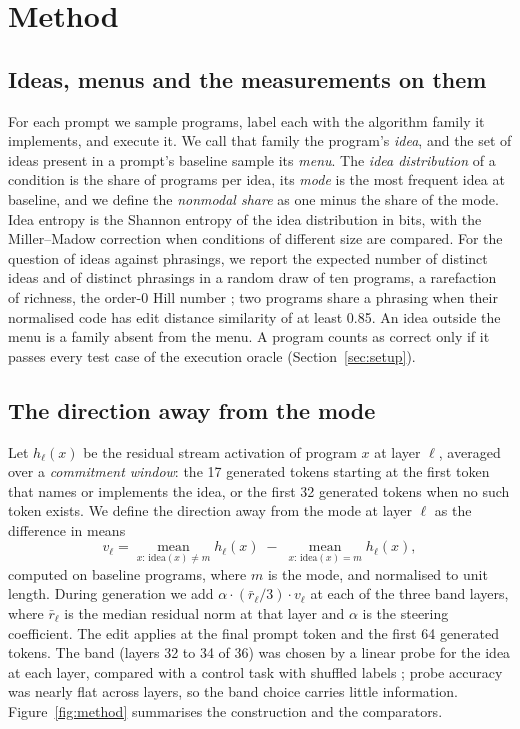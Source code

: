 \documentclass[11pt,letterpaper]{article}
\begin{document}
\section{Method}
\label{sec:method}

\subsection{Ideas, menus and the measurements on them}
\label{sec:measures}

For each prompt we sample programs, label each with the algorithm family it implements, and execute it. We call that family the program's \emph{idea}, and the set of ideas present in a prompt's baseline sample its \emph{menu}. The \emph{idea distribution} of a condition is the share of programs per idea, its \emph{mode} is the most frequent idea at baseline, and we define the \emph{nonmodal share} as one minus the share of the mode. Idea entropy is the Shannon entropy of the idea distribution in bits, with the Miller--Madow correction when conditions of different size are compared. For the question of ideas against phrasings, we report the expected number of distinct ideas and of distinct phrasings in a random draw of ten programs, a rarefaction of richness, the order-0 Hill number \citep{Hill1973}; two programs share a phrasing when their normalised code has edit distance similarity of at least 0.85. An idea outside the menu is a family absent from the menu. A program counts as correct only if it passes every test case of the execution oracle (Section~\ref{sec:setup}).

\subsection{The direction away from the mode}
\label{sec:direction}

Let $h_\ell(x)$ be the residual stream activation of program $x$ at layer $\ell$, averaged over a \emph{commitment window}: the 17 generated tokens starting at the first token that names or implements the idea, or the first 32 generated tokens when no such token exists. We define the direction away from the mode at layer $\ell$ as the difference in means
\begin{equation}
  v_\ell = \operatorname*{mean}_{x:\,\mathrm{idea}(x)\neq m} h_\ell(x) \;-\; \operatorname*{mean}_{x:\,\mathrm{idea}(x)=m} h_\ell(x),
\end{equation}
computed on baseline programs, where $m$ is the mode, and normalised to unit length. During generation we add $\alpha \cdot (\bar r_\ell / 3) \cdot v_\ell$ at each of the three band layers, where $\bar r_\ell$ is the median residual norm at that layer and $\alpha$ is the steering coefficient. The edit applies at the final prompt token and the first 64 generated tokens. The band (layers 32 to 34 of 36) was chosen by a linear probe for the idea at each layer, compared with a control task with shuffled labels \citep{Hewitt2019}; probe accuracy was nearly flat across layers, so the band choice carries little information. Figure~\ref{fig:method} summarises the construction and the comparators.
\end{document}
